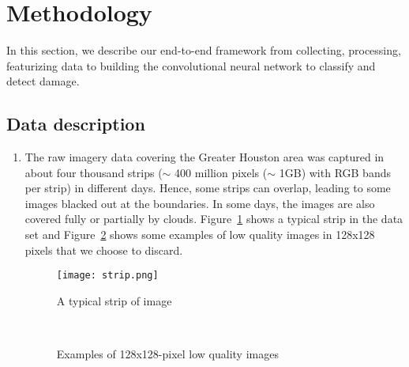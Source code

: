 \documentclass[journal, 12pt, onecolumn,draftclsnofoot]{IEEEtran}
\begin{document}
\section{Methodology}\label{sec:method}
In this section, we describe our end-to-end framework from collecting, processing, featurizing data to building the convolutional neural network to classify and detect damage. 

\subsection{Data description}
\begin{enumerate}
    \item The raw imagery data covering the Greater Houston area was captured in about four thousand strips ($\sim$ 400 million pixels ($\sim$ 1GB) with RGB bands per strip) in different days. Hence, some strips can overlap, leading to some images blacked out at the boundaries. In some days, the images are also covered fully or partially by clouds.
Figure~\ref{fig:strip} shows a typical strip in the data set and Figure~\ref{fig:bad_images} shows some examples of low quality images in 128x128 pixels that we choose to discard.


\begin{figure}[h]{\centering
\texttt{[image: strip.png]} \\
\centering\caption{\small{A typical strip of image}}
\label{fig:strip}
}
\end{figure}


\begin{figure}[h]{\centering
{}
\\
\caption{\small{Examples of 128x128-pixel low quality images}}
\label{fig:bad_images}
}
\end{figure}


\end{enumerate}
\end{document}
